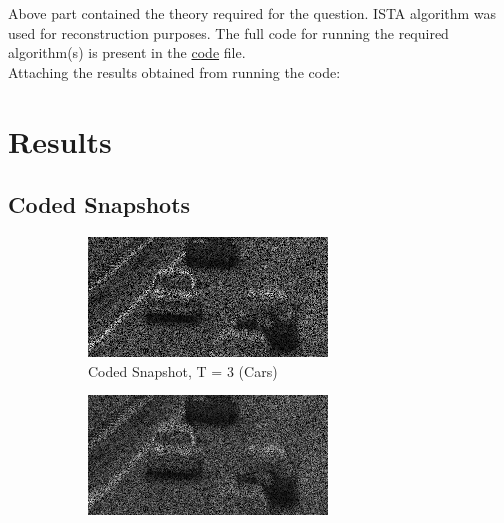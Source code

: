\documentclass{article}
\begin{document}
\begin{enumerate}
Above part contained the theory required for the question. ISTA algorithm was used for reconstruction purposes. The full code for running the required algorithm(s) is present in the \hyperlink{../code/code.m}{code} file.\\
Attaching the results obtained from running the code:
\section{Results}

\subsection{Coded Snapshots}

\begin{figure}[h!]
    \centering
    \begin{subfigure}{0.3\textwidth}
        \centering
        \includegraphics[width=\linewidth]{../images/cars/coded snapshot, T = 3.png}
        \caption{Coded Snapshot, T = 3 (Cars)}
    \end{subfigure}
    \begin{subfigure}{0.3\textwidth}
        \centering
        \includegraphics[width=\linewidth]{../images/cars/coded snapshot, T = 5.png}

\end{subfigure}
\end{figure}
\end{enumerate}
\end{document}
